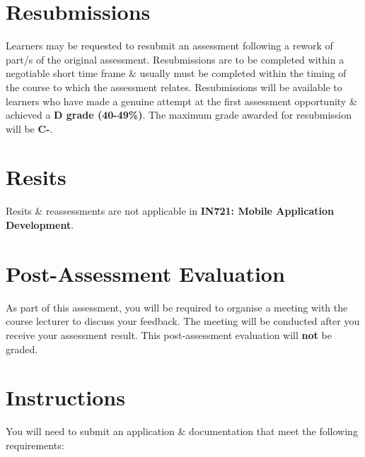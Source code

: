 \documentclass{article}
\begin{document}
\section*{Resubmissions}
Learners may be requested to resubmit an assessment following a rework of part/s of the original assessment. Resubmissions are to be completed within a negotiable short time frame \& usually must be completed within the timing of the course to which the assessment relates. Resubmissions will be available to learners who have made a genuine attempt at the first assessment opportunity \& achieved a \textbf{D grade (40-49\%)}. The maximum grade awarded for resubmission will be \textbf{C-}.

\section*{Resits}
Resits \& reassessments are not applicable in \textbf{IN721: Mobile Application Development}. 

\section*{Post-Assessment Evaluation}
As part of this assessment, you will be required to organise a meeting with the course lecturer to discuss your feedback. The meeting will be conducted after you receive your assessment result. This post-assessment evaluation will \textbf{not} be graded.

\newpage

\section*{Instructions}
You will need to submit an application \& documentation that meet the following requirements:
\end{document}
